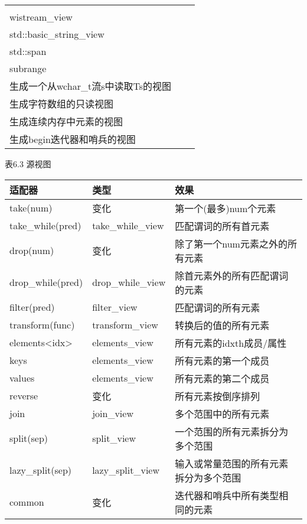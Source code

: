 \begin{longtable}[c]{|l|l|l|}
\begin{tabular}[c]{@{}l@{}}istream\_view\\ wistream\_view\\ std::basic\_string\_view\\ std::span\\ subrange\end{tabular} &
\begin{tabular}[c]{@{}l@{}}生成从字符流s读取Ts的视图\\ 生成一个从wchar\_t流s中读取Ts的视图\\ 生成字符数组的只读视图\\ 生成连续内存中元素的视图\\ 生成begin迭代器和哨兵的视图\end{tabular} \\ \hline
\end{longtable}

\begin{center}
表6.3 源视图
\end{center}

\begin{longtable}[c]{|l|l|l|}
\hline
\textbf{适配器} & \textbf{类型}   & \textbf{效果}                                       \\ \hline
\endfirsthead
%
\endhead
%
take(num)        & 变化          & 第一个(最多)num个元素                         \\ \hline
take\_while(pred)                    & take\_while\_view & 匹配谓词的所有首元素                        \\ \hline
drop(num)        & 变化          & 除了第一个num元素之外的所有元素                     \\ \hline
drop\_while(pred)                    & drop\_while\_view & 除首元素外的所有匹配谓词的元素                 \\ \hline
filter(pred)     & filter\_view    & 匹配谓词的所有元素                  \\ \hline
transform(func)  & transform\_view & 转换后的值的所有元素                \\ \hline
elements\textless{}idx\textgreater{} & elements\_view    & 所有元素的idxth成员/属性                         \\ \hline
keys             & elements\_view  & 所有元素的第一个成员                      \\ \hline
values           & elements\_view  & 所有元素的第二个成员                     \\ \hline
reverse          & 变化          & 所有元素按倒序排列                         \\ \hline
join             & join\_view      & 多个范围中的所有元素            \\ \hline
split(sep)       & split\_view     & 一个范围的所有元素拆分为多个范围    \\ \hline
lazy\_split(sep)                     & lazy\_split\_view & 输入或常量范围的所有元素拆分为多个范围 \\ \hline
common           & 变化          & 迭代器和哨兵中所有类型相同的元素 \\ \hline
\end{longtable}

